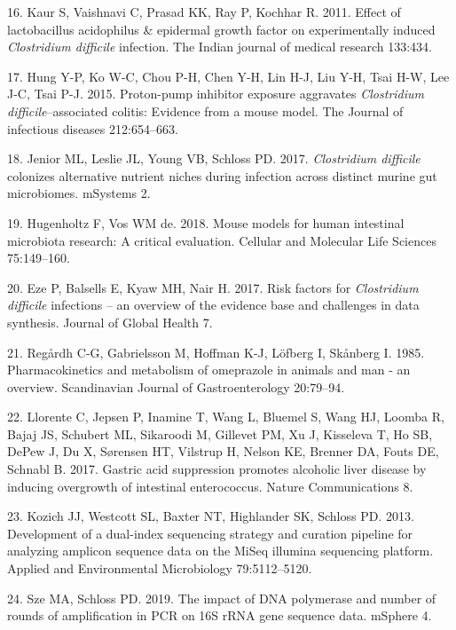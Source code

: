 \documentclass[11pt,]{article}
\begin{document}
\hypertarget{ref-kaur2011effect}{}
16. Kaur S, Vaishnavi C, Prasad KK, Ray P, Kochhar R. 2011. Effect of
lactobacillus acidophilus \& epidermal growth factor on experimentally
induced \emph{Clostridium difficile} infection. The Indian journal of
medical research 133:434.

\hypertarget{ref-hung2015proton}{}
17. Hung Y-P, Ko W-C, Chou P-H, Chen Y-H, Lin H-J, Liu Y-H, Tsai H-W,
Lee J-C, Tsai P-J. 2015. Proton-pump inhibitor exposure aggravates
\emph{Clostridium difficile}--associated colitis: Evidence from a mouse
model. The Journal of infectious diseases 212:654--663.

\hypertarget{ref-Jenior2017}{}
18. Jenior ML, Leslie JL, Young VB, Schloss PD. 2017. \emph{Clostridium
difficile} colonizes alternative nutrient niches during infection across
distinct murine gut microbiomes. mSystems 2.

\hypertarget{ref-Hugenholtz2018}{}
19. Hugenholtz F, Vos WM de. 2018. Mouse models for human intestinal
microbiota research: A critical evaluation. Cellular and Molecular Life
Sciences 75:149--160.

\hypertarget{ref-Eze2017}{}
20. Eze P, Balsells E, Kyaw MH, Nair H. 2017. Risk factors for
\emph{Clostridium difficile} infections -- an overview of the evidence
base and challenges in data synthesis. Journal of Global Health 7.

\hypertarget{ref-Regrdh1985}{}
21. Regårdh C-G, Gabrielsson M, Hoffman K-J, Löfberg I, Skånberg I.
1985. Pharmacokinetics and metabolism of omeprazole in animals and man -
an overview. Scandinavian Journal of Gastroenterology 20:79--94.

\hypertarget{ref-Llorente2017}{}
22. Llorente C, Jepsen P, Inamine T, Wang L, Bluemel S, Wang HJ, Loomba
R, Bajaj JS, Schubert ML, Sikaroodi M, Gillevet PM, Xu J, Kisseleva T,
Ho SB, DePew J, Du X, Sørensen HT, Vilstrup H, Nelson KE, Brenner DA,
Fouts DE, Schnabl B. 2017. Gastric acid suppression promotes alcoholic
liver disease by inducing overgrowth of intestinal enterococcus. Nature
Communications 8.

\hypertarget{ref-Kozich2013}{}
23. Kozich JJ, Westcott SL, Baxter NT, Highlander SK, Schloss PD. 2013.
Development of a dual-index sequencing strategy and curation pipeline
for analyzing amplicon sequence data on the MiSeq illumina sequencing
platform. Applied and Environmental Microbiology 79:5112--5120.

\hypertarget{ref-Sze2019}{}
24. Sze MA, Schloss PD. 2019. The impact of DNA polymerase and number of
rounds of amplification in PCR on 16S rRNA gene sequence data. mSphere
4.
\end{document}
